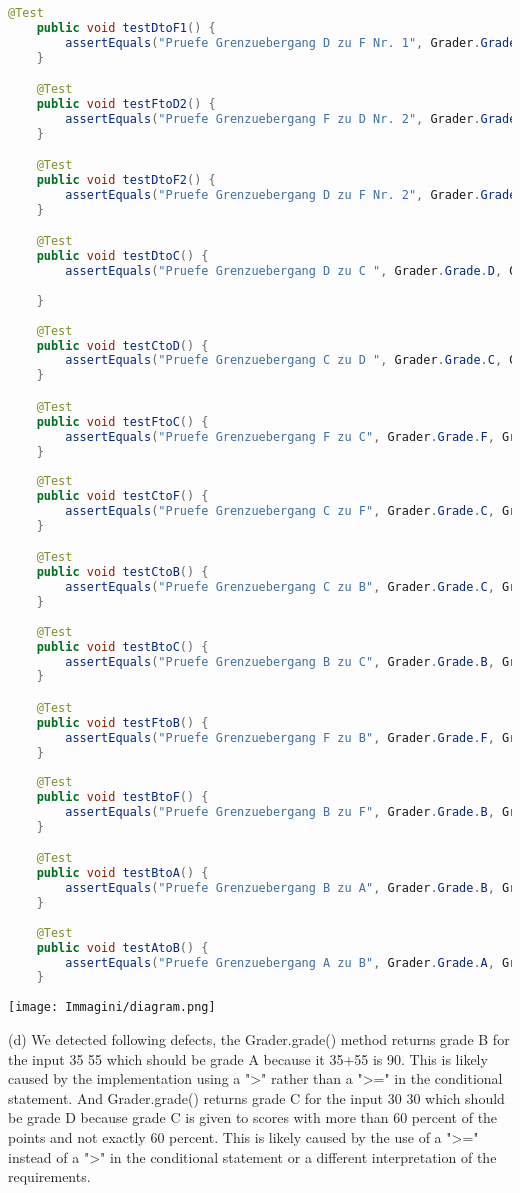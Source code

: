\begin{parlist}
\begin{lstlisting}[language=java,frame=trBL]
	@Test
	public void testDtoF1() {
		assertEquals("Pruefe Grenzuebergang D zu F Nr. 1", Grader.Grade.D, Grader.grade(30, 21));
	}

	@Test
	public void testFtoD2() {
		assertEquals("Pruefe Grenzuebergang F zu D Nr. 2", Grader.Grade.F, Grader.grade(19, 25));
	}

	@Test
	public void testDtoF2() {
		assertEquals("Pruefe Grenzuebergang D zu F Nr. 2", Grader.Grade.D, Grader.grade(21, 25));
	}

	@Test
	public void testDtoC() {
		assertEquals("Pruefe Grenzuebergang D zu C ", Grader.Grade.D, Grader.grade(30, 30));
		
	}
	
	@Test
	public void testCtoD() {
		assertEquals("Pruefe Grenzuebergang C zu D ", Grader.Grade.C, Grader.grade(31, 31));
	}

	@Test
	public void testFtoC() {
		assertEquals("Pruefe Grenzuebergang F zu C", Grader.Grade.F, Grader.grade(19, 45));
	}
	
	@Test
	public void testCtoF() {
		assertEquals("Pruefe Grenzuebergang C zu F", Grader.Grade.C, Grader.grade(20, 45));
	}

	@Test
	public void testCtoB() {
		assertEquals("Pruefe Grenzuebergang C zu B", Grader.Grade.C, Grader.grade(30, 44));
	}
	
	@Test
	public void testBtoC() {
		assertEquals("Pruefe Grenzuebergang B zu C", Grader.Grade.B, Grader.grade(30, 45));
	}

	@Test
	public void testFtoB() {
		assertEquals("Pruefe Grenzuebergang F zu B", Grader.Grade.F, Grader.grade(19, 55));
	}
	
	@Test
	public void testBtoF() {
		assertEquals("Pruefe Grenzuebergang B zu F", Grader.Grade.B, Grader.grade(20, 55));
	}

	@Test
	public void testBtoA() {
		assertEquals("Pruefe Grenzuebergang B zu A", Grader.Grade.B, Grader.grade(35, 54));
	}
	
	@Test
	public void testAtoB() {
		assertEquals("Pruefe Grenzuebergang A zu B", Grader.Grade.A, Grader.grade(35, 55));
	}

\end{lstlisting}

\center\texttt{[image: Immagini/diagram.png]}



\item (d) We detected following defects, the Grader.grade() method returns grade B for the input 35 55 which should be grade A because it 35+55 is 90. This is likely caused by the implementation using a ">" rather than a ">=" in the conditional statement. And Grader.grade() returns grade C for the input 30 30 which should be grade D because grade C is given to scores with more than 60 percent of the points and not exactly 60 percent. This is likely caused by the use of a ">=" instead of a ">" in the conditional statement or a different interpretation of the requirements.

\end{parlist}

